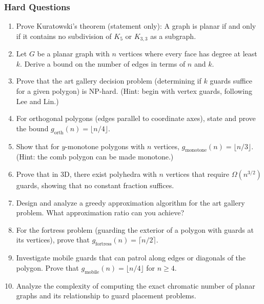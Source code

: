 \documentclass{article}
\theoremstyle{definition}
\begin{document}
\subsubsection{Hard Questions}
\begin{enumerate}[start=21]
\item Prove Kuratowski's theorem (statement only): A graph is planar if and only if it contains no subdivision of $K_5$ or $K_{3,3}$ as a subgraph.

\item Let $G$ be a planar graph with $n$ vertices where every face has degree at least $k$. Derive a bound on the number of edges in terms of $n$ and $k$.

\item Prove that the art gallery decision problem (determining if $k$ guards suffice for a given polygon) is NP-hard. (Hint: begin with vertex guards, following Lee and Lin.)

\item For orthogonal polygons (edges parallel to coordinate axes), state and prove the bound $g_{\text{orth}}(n) = \lfloor n/4 \rfloor$.

\item Show that for $y$-monotone polygons with $n$ vertices, $g_{\text{monotone}}(n) = \lfloor n/3 \rfloor$. (Hint: the comb polygon can be made monotone.)

\item Prove that in 3D, there exist polyhedra with $n$ vertices that require $\Omega(n^{3/2})$ guards, showing that no constant fraction suffices.

\item Design and analyze a greedy approximation algorithm for the art gallery problem. What approximation ratio can you achieve?

\item For the fortress problem (guarding the exterior of a polygon with guards at its vertices), prove that $g_{\text{fortress}}(n) = \lceil n/2 \rceil$.

\item Investigate mobile guards that can patrol along edges or diagonals of the polygon. Prove that $g_{\text{mobile}}(n) = \lfloor n/4 \rfloor$ for $n \geq 4$.

\item Analyze the complexity of computing the exact chromatic number of planar graphs and its relationship to guard placement problems.
\end{enumerate}
\end{document}
